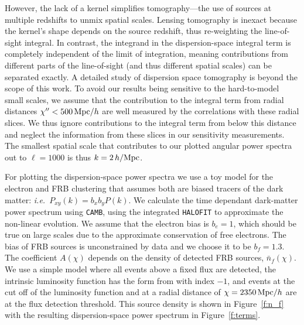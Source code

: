 \documentclass[twocolumn,prl,floatfix]{revtex4-1}
\begin{document}
However, the lack of a kernel simplifies tomography---the use of sources at
multiple redshifts to unmix spatial scales.
Lensing tomography is inexact because the kernel's shape depends on
the source redshift, thus re-weighting the line-of-sight integral.
In contrast, the integrand in the dispersion-space integral
term is completely independent of the limit of integration, meaning
contributions from different parts of the line-of-sight (and thus different
spatial scales) can be separated exactly. A detailed study of dispersion space
tomography is beyond the scope of this work.  To avoid our results being
sensitive to the hard-to-model small scales, we assume that the contribution to the
integral term from radial distances $\chi'' < 500\,{\rm Mpc}/h$ are well
measured by the correlations with these radial slices. We thus ignore
contributions to the integral term from below this distance and neglect the
information from these slices in our sensitivity measurements. The smallest
spatial scale that contributes to our plotted angular power spectra out to
$\ell=1000$ is thus $k=2\,h/{\rm Mpc}$.

For plotting the dispersion-space power spectra we use a toy model for the electron and
FRB clustering that assumes both are biased tracers of the dark matter:
\emph{i.e.}~$P_{xy}(k)=b_x b_y P(k)$.  We
calculate the time dependant dark-matter power spectrum using {\tt CAMB}, using
the integrated {\tt HALOFIT} to approximate the non-linear evolution. We assume
that the electron bias is $b_e=1$, which should be true on large scales due to
the approximate conservation of free electrons. The bias of FRB sources is
unconstrained by data and we choose it to be $b_f=1.3$. The coefficient
$A(\chi)$ depends on the density of detected FRB sources, $\bar n_f(\chi)$.
We use a simple model where all events above a fixed flux are detected,
the intrinsic luminosity function has the form from
\citet{1976ApJ...203..297S} with index $-1$, and events at the cut off of the
luminosity function and at
a radial distance of $\chi=2350\,{\rm Mpc}/h$ are at the flux detection threshold.
This source density is shown in Figure~\ref{f:n_f} with the resulting dispersion-space
power spectrum in Figure~\ref{f:terms}.
\end{document}
